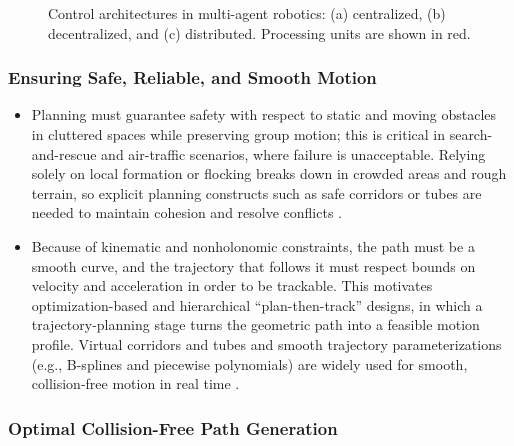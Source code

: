 \begin{figure}[htbp]
  \centering
  \caption{Control architectures in multi-agent robotics: (a) centralized,
           (b) decentralized, and (c) distributed. Processing units are shown in
           red.}
  \label{fig:architectures}
\end{figure}

\subsubsection{Ensuring Safe, Reliable, and Smooth Motion}

\begin{itemize}
  \item {} Planning must guarantee safety with respect
        to static and moving obstacles in cluttered spaces while preserving group
        motion; this is critical in search-and-rescue and air-traffic scenarios,
        where failure is unacceptable. Relying solely on local formation or
        flocking breaks down in crowded areas and rough terrain, so explicit
        planning constructs such as safe corridors or tubes are needed to
        maintain cohesion and resolve conflicts
        \cite{lin2022review,abujabal2024path,mao2023optimal,mao2024tube}.
  \item {} Because of kinematic and nonholonomic constraints, the
        path must be a smooth curve, and the trajectory that follows it must
        respect bounds on velocity and acceleration in order to be trackable.
        This motivates optimization-based and hierarchical ``plan-then-track''
        designs, in which a trajectory-planning stage turns the geometric path
        into a feasible motion profile. Virtual corridors and tubes and smooth
        trajectory parameterizations (e.g., B-splines and piecewise polynomials)
        are widely used for smooth, collision-free motion in real time
        \cite{lin2022review,abujabal2024path,mao2023optimal}.
\end{itemize}

\subsubsection{Optimal Collision-Free Path Generation}

